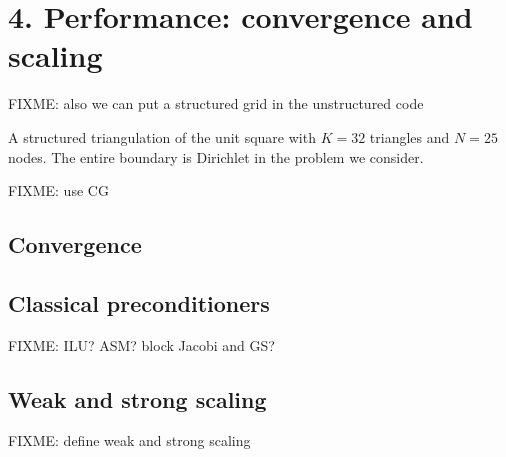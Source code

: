 
\chapter{4. Performance: convergence and scaling}

\vspace{4cm}

FIXME: also we can put a structured grid in the unstructured code

\begin{marginfigure}

\caption{A structured triangulation of the unit square with $K=32$ triangles and $N=25$ nodes.  The entire boundary is Dirichlet in the problem we consider.}
\label{fig:structuredfem}
\end{marginfigure}

FIXME: use CG


\section{Convergence}

\section{Classical preconditioners}

FIXME:  ILU?  ASM?  block Jacobi and GS?

\section{Weak and strong scaling}

FIXME: define weak and strong scaling

